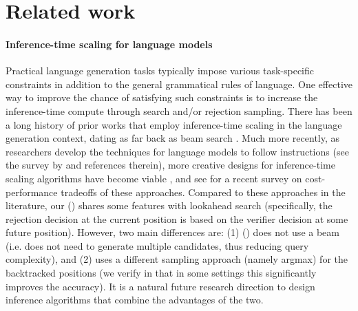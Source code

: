 \section{Related work}
\label{sec:related_works}


\paragraph{Inference-time scaling for language models}
Practical language generation tasks typically impose various task-specific constraints in addition to the general grammatical rules of language.
One effective way to improve the chance of satisfying such constraints
is to increase the inference-time compute 
through search and/or rejection sampling.
There has been a long history of prior works that employ inference-time scaling in the language generation context, 
dating as far back as beam search \citep{lowerre1976harpy,hayes1976speech,ow1988filtered,jurafsky2000speech,graves2012sequence}.
Much more recently, as researchers develop the techniques for language models to follow instructions 
(see the survey by \citet{zhang2023instruction} and references therein),
more creative designs for inference-time scaling algorithms have become viable 
\citep{wang2022self,yao2023tree,zhang2023planning,zhou2023language,choi2023kcts,liu2024don,xie2024self,snell2024scaling,zhao2024probabilistic},
and see \citet{wu2024inference} for a recent survey on cost-performance tradeoffs of these approaches.
Compared to these approaches in the literature, 
our \algoName () shares some features with lookahead search \citep{snell2024scaling}
(specifically, the rejection decision at the current position is based on the verifier decision at some future position).
However, two main differences are:
(1) \algoName ()
does not use a beam (i.e. does not need to generate multiple candidates, thus reducing query complexity),
and (2)  uses a different sampling approach (namely argmax) for the backtracked positions (we verify in  that in some settings this significantly improves the accuracy).
It is a natural future research direction to design inference algorithms that combine the advantages of the two.



